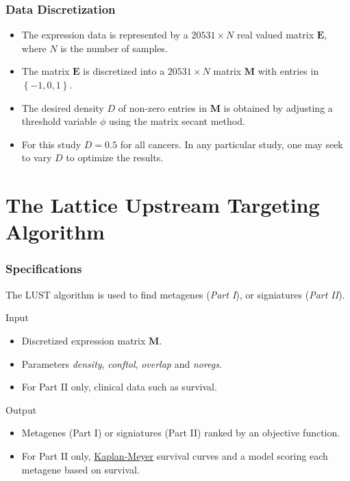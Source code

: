 \documentclass[
	11pt, %
]{beamer}
\begin{document}
\begin{frame}
	\frametitle{Data Discretization}
	
	\begin{itemize}
        \item The expression data is represented by a $20531 \times N$ real valued matrix $\mathbf{E}$, where $N$ is the number of samples.
        \pause
        \item The matrix $\mathbf{E}$ is discretized into a $20531 \times N$ matrix $\mathbf{M}$ with entries in $\left\{ -1, 0, 1\right\}$.
        \pause
        \item The desired density $D$ of non-zero entries in $\mathbf{M}$ is obtained by adjusting a threshold variable $\phi$ using the matrix secant method.
        \pause
        \item For this study $D = 0.5$ for all cancers. In any particular study, one may seek to vary $D$ to optimize the results.
    \end{itemize}
\end{frame}


\section{The Lattice Upstream Targeting Algorithm}

\begin{frame}
	\frametitle{Specifications}
	\begin{block}{}
        The LUST algorithm is used to find metagenes (\emph{Part I}), or signiatures (\emph{Part II}).
    \end{block}
    \pause
    \begin{block}{Input}
        \begin{itemize}
            \item Discretized expression matrix $\mathbf{M}$.
            \item Parameters \emph{density}, \emph{conftol}, \emph{overlap} and \emph{noregs}.
            \item For Part II only, clinical data such as survival.
        \end{itemize}
    \end{block}
    \pause
    \begin{block}{Output}
        \begin{itemize}
            \item Metagenes (Part I) or signiatures (Part II) ranked by an objective function.
            \item For Part II only, \href{https://www.mygreatlearning.com/blog/kaplan-meier-curve-explained}{Kaplan-Meyer} survival curves and a model scoring each metagene based on survival.
        \end{itemize}
    \end{block}
\end{frame}
\end{document}
